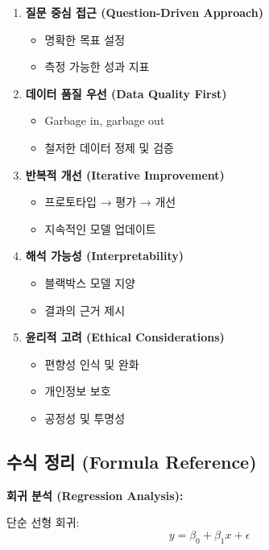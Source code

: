 \documentclass[12pt,a4paper]{article}
\begin{document}
\begin{enumerate}
    \item \textbf{질문 중심 접근 (Question-Driven Approach)}
    \begin{itemize}
        \item 명확한 목표 설정
        \item 측정 가능한 성과 지표
    \end{itemize}

    \item \textbf{데이터 품질 우선 (Data Quality First)}
    \begin{itemize}
        \item Garbage in, garbage out
        \item 철저한 데이터 정제 및 검증
    \end{itemize}

    \item \textbf{반복적 개선 (Iterative Improvement)}
    \begin{itemize}
        \item 프로토타입 → 평가 → 개선
        \item 지속적인 모델 업데이트
    \end{itemize}

    \item \textbf{해석 가능성 (Interpretability)}
    \begin{itemize}
        \item 블랙박스 모델 지양
        \item 결과의 근거 제시
    \end{itemize}

    \item \textbf{윤리적 고려 (Ethical Considerations)}
    \begin{itemize}
        \item 편향성 인식 및 완화
        \item 개인정보 보호
        \item 공정성 및 투명성
    \end{itemize}
\end{enumerate}

\subsection{수식 정리 (Formula Reference)}

\textbf{회귀 분석 (Regression Analysis):}

단순 선형 회귀:
\[
y = \beta_0 + \beta_1 x + \epsilon
\]
\end{document}
